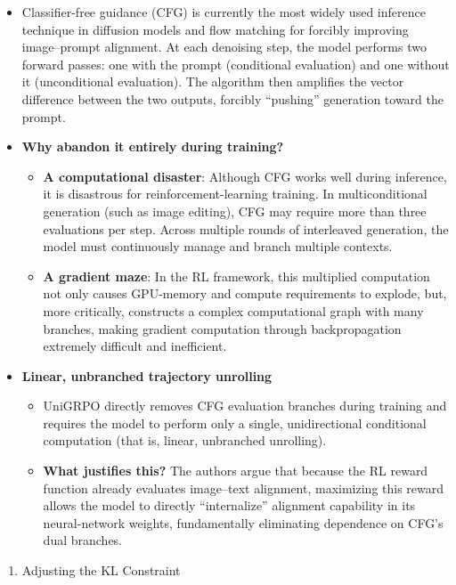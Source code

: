 \begin{itemize}
\tightlist
\item
  Classifier-free guidance (CFG) is currently the most widely used inference technique in diffusion models and flow matching for forcibly improving image--prompt alignment. At each denoising step, the model performs two forward passes: one with the prompt (conditional evaluation) and one without it (unconditional evaluation). The algorithm then amplifies the vector difference between the two outputs, forcibly ``pushing'' generation toward the prompt.
\item
  \textbf{Why abandon it entirely during training?}

  \begin{itemize}
  \tightlist
  \item
    \textbf{A computational disaster}: Although CFG works well during inference, it is disastrous for reinforcement-learning training. In multiconditional generation (such as image editing), CFG may require more than three evaluations per step. Across multiple rounds of interleaved generation, the model must continuously manage and branch multiple contexts.
  \item
    \textbf{A gradient maze}: In the RL framework, this multiplied computation not only causes GPU-memory and compute requirements to explode, but, more critically, constructs a complex computational graph with many branches, making gradient computation through backpropagation extremely difficult and inefficient.
  \end{itemize}
\item
  \textbf{Linear, unbranched trajectory unrolling}

  \begin{itemize}
  \tightlist
  \item
    UniGRPO directly removes CFG evaluation branches during training and requires the model to perform only a single, unidirectional conditional computation (that is, linear, unbranched unrolling).
  \item
    \textbf{What justifies this?} The authors argue that because the RL reward function already evaluates image--text alignment, maximizing this reward allows the model to directly ``internalize'' alignment capability in its neural-network weights, fundamentally eliminating dependence on CFG's dual branches.
  \end{itemize}
\end{itemize}

\begin{enumerate}
\def\labelenumi{\arabic{enumi}.}
\setcounter{enumi}{3}
\tightlist
\item
  Adjusting the KL Constraint
\end{enumerate}


